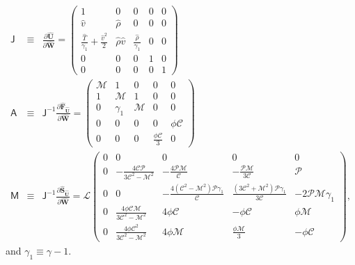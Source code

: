 \documentclass[preprint,12pt,authoryear]{elsarticle}
\newcommand{\tenA}{\mathsf{A}}
\newcommand{\tenJ}{\mathsf{J}}
\newcommand{\tenM}{\mathsf{M}}
\newcommand{\hrho}{\hat{\rho}}
\newcommand{\hv}{\hat{v}}
\newcommand{\hT}{\hat{T}}
\newcommand{\hvecFU}{\hat{\mathbf{F}}_{\hat{\mathbf{U}}}}
\newcommand{\hvecU}{{\hat{\mathbf{U}}}}
\newcommand{\hvecW}{{\hat{\mathbf{W}}}}
\newcommand{\hvecS}{\hat{\mathbf{S}}}
\newcommand{\calC}{\mathcal{C}}
\newcommand{\calP}{\mathcal{P}}
\newcommand{\calM}{\mathcal{M}}
\newcommand{\calL}{\mathcal{L}}
\begin{document}
\begin{eqnarray}
    \tenJ & \equiv & \frac{\partial\hvecU}{\partial\hvecW} = \left(\begin{array}{ccccc}
    1 & 0 & 0 & 0 & 0 \\
    \hv & \hrho & 0 & 0 & 0 \\
    \frac{\hT}{\gamma_1} + \frac{\hv^2}{2} & \hrho\hv & \frac{\hrho}{\gamma_1} & 0 & 0 \\
    0 & 0 & 0 & 1 & 0 \\
    0 & 0 & 0 & 0 & 1
    \end{array}\right)
    \\
    \tenA & \equiv & \tenJ^{-1}\frac{\partial\hvecFU}{\partial\hvecW} = \left(\begin{array}{ccccc}
    \calM & 1 & 0 & 0 & 0 \\
    1 & \calM & 1 & 0 & 0 \\
    0 & \gamma_1 & \calM & 0 & 0 \\
    0 & 0 & 0 & 0 & \phi\calC \\
    0 & 0 & 0 & \frac{\phi\calC}{3} & 0
    \end{array}\right)
    \\
    \tenM & \equiv & \tenJ^{-1}\frac{\partial\hvecS_{\hvecU}}{\partial\hvecW} =
    \calL \left(\begin{array}{ccccc}
    0 & 0 & 0 & 0 & 0 \\
    0 & -\frac{4\calC \calP}{3\calC^2-\calM^2} & -\frac{4\calP\calM}{\calC} & -\frac{\calP\calM}{3\calC} & \calP \\
    0 & 0 & -\frac{4\left(\calC^2-\calM^2\right)\calP\gamma_1}{\calC} & \frac{\left(3\calC^2+\calM^2\right)\calP\gamma_1}{3\calC} & -2\calP\calM\gamma_1 \\
    0 & \frac{4\phi \calC\calM}{3\calC^2-\calM^2} & 4\phi\calC & -\phi\calC & \phi\calM \\
    0 & \frac{4\phi\calC^2}{3\calC^2-\calM^2} & 4\phi\calM & \frac{\phi\calM}{3} & -\phi\calC
    \end{array}\right),
    \label{eq:M_matrix}
\end{eqnarray}
and $\gamma_1 \equiv \gamma-1$.
\end{document}
